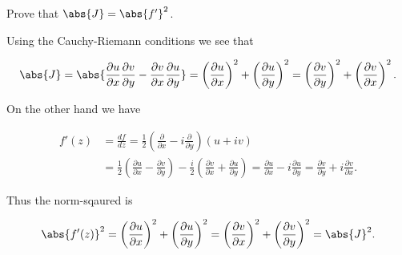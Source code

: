 \documentclass[english,a4paper,12pt]{report}
\begin{document}
{Prove that \(\abs{J} = \abs{f'}^2 \). }
{Using the Cauchy-Riemann conditions we see that 

\begin{equation}
    \abs{J} = \abs{\frac{\partial u}{\partial x} \frac{\partial v}{\partial y} - \frac{\partial v}{\partial x} \frac{\partial u}{\partial y} } = \left( \frac{\partial u}{\partial x}  \right)^2 + \left( \frac{\partial u}{\partial y}  \right)^2 = \left( \frac{\partial v}{\partial y}  \right)^2 + \left( \frac{\partial v}{\partial x}  \right)^2.   
\end{equation}

On the other hand we have

\begin{equation}
    \begin{aligned} 
    f'(z) &= \frac{df}{dz} = \frac{1}{2} \left( \frac{\partial }{\partial x} - i \frac{\partial }{\partial y}  \right) (u+iv) \\
    &= \frac{1}{2} \left( \frac{\partial u}{\partial x} - \frac{\partial v}{\partial y}  \right) - \frac{i}{2} \left( \frac{\partial v}{\partial x} + \frac{\partial u}{\partial y}  \right) = \frac{\partial u}{\partial x} - i \frac{\partial u}{\partial y} = \frac{\partial v}{\partial y} + i \frac{\partial v}{\partial x}.
    \end{aligned} 
\end{equation}

Thus the norm-sqaured is 

\begin{equation}
    \abs{f'(z)}^2 = \left( \frac{\partial u}{\partial x}  \right)^2 + \left( \frac{\partial u}{\partial y}  \right)^2 = \left( \frac{\partial v}{\partial x}  \right)^2 + \left( \frac{\partial v}{\partial y}  \right)^2 = \abs{J}^2.  
\end{equation}
~
} 
\end{document}
